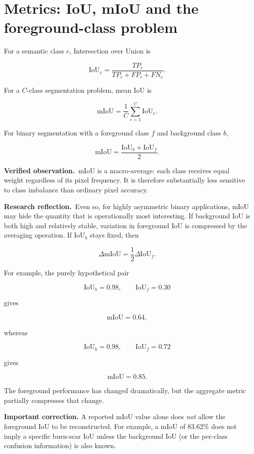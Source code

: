 \documentclass[11pt,a4paper]{article}
\newcommand{\verified}{\textcolor{verifiedgreen}{\textbf{Verified observation.}}}
\newcommand{\reflection}{\textcolor{reflectionorange}{\textbf{Research reflection.}}}
\begin{document}
\section{Metrics: IoU, mIoU and the foreground-class problem}

For a semantic class \(c\), Intersection over Union is

\[
\mathrm{IoU}_c
=
\frac{TP_c}{TP_c + FP_c + FN_c}.
\]

For a \(C\)-class segmentation problem, mean IoU is

\[
\mathrm{mIoU}
=
\frac{1}{C}\sum_{c=1}^{C}\mathrm{IoU}_c.
\]

For binary segmentation with a foreground class \(f\) and background class \(b\),

\[
\mathrm{mIoU}
=
\frac{\mathrm{IoU}_{b}+\mathrm{IoU}_{f}}{2}.
\]

\verified\ mIoU is a macro-average: each class receives equal weight regardless of its pixel
frequency. It is therefore substantially less sensitive to class imbalance than ordinary
pixel accuracy.

\reflection\ Even so, for highly asymmetric binary applications, mIoU may hide the quantity
that is operationally most interesting. If background IoU is both high and relatively stable,
variation in foreground IoU is compressed by the averaging operation. If
\(\mathrm{IoU}_{b}\) stays fixed, then

\[
\Delta\mathrm{mIoU}
=
\frac{1}{2}\Delta\mathrm{IoU}_{f}.
\]

For example, the purely hypothetical pair

\[
\mathrm{IoU}_{b}=0.98,\qquad \mathrm{IoU}_{f}=0.30
\]

gives

\[
\mathrm{mIoU}=0.64,
\]

whereas

\[
\mathrm{IoU}_{b}=0.98,\qquad \mathrm{IoU}_{f}=0.72
\]

gives

\[
\mathrm{mIoU}=0.85.
\]

The foreground performance has changed dramatically, but the aggregate metric partially
compresses that change.

\textbf{Important correction.} A reported mIoU value alone does \emph{not} allow the
foreground IoU to be reconstructed. For example, a mIoU of 83.62\% does not imply a specific
burn-scar IoU unless the background IoU (or the per-class confusion information) is also
known.
\end{document}
